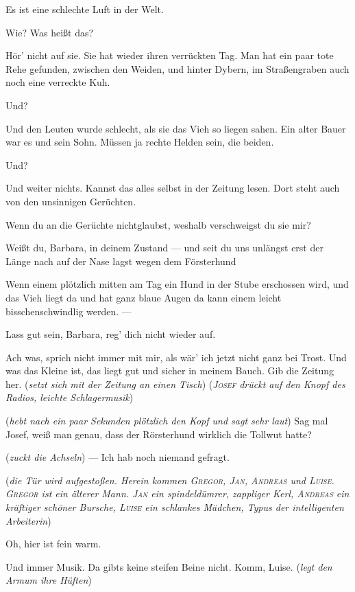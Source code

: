 \documentclass[
	final,
	a4paper,
	ngerman,
	mpinclude = true, %
	twoside = true,
	open = right,
	cleardoublepage = plain,
	DIV = 13,
	BCOR = 1cm,
	titlepage = firstiscover,
	]{scrbook}
\newcommand{\direction}[1]{(\textit{#1})}
\newcommand{\thecharacter}[1]{\textup{\textsc{#1}}\xspace}
\newcommand{\theBarbara}{\thecharacter{Barbara}}
\newcommand{\theJosef}{\thecharacter{Josef}}
\newcommand{\theKathrine}{\thecharacter{Kathrine}}
\newcommand{\theGregor}{\thecharacter{Gregor}}
\newcommand{\theJan}{\thecharacter{Jan}}
\newcommand{\theAndreas}{\thecharacter{Andreas}}
\newcommand{\theLuise}{\thecharacter{Luise}}
\newcommand{\character}[1]{\item[#1]}
\newcommand{\Barbara}{\character{\theBarbara}}
\newcommand{\Josef}{\character{\theJosef}}
\newcommand{\Kathrine}{\character{\theKathrine}}
\newcommand{\Gregor}{\character{\theGregor}}
\newcommand{\Jan}{\character{\theJan}}
\begin{document}
\begin{play}
\Kathrine
Es ist eine schlechte Luft in der Welt.

\Barbara
Wie? Was heißt das?

\Josef
Hör' nicht auf sie. Sie hat wieder ihren verrückten Tag. Man hat ein paar tote Rehe gefunden, zwischen den Weiden, und hinter Dybern, im Straßengraben auch noch eine verreckte Kuh.

\Barbara
Und?

\Josef
Und den Leuten wurde schlecht, als sie das Vieh so liegen sahen. Ein alter Bauer war es und sein Sohn. Müssen ja rechte Helden sein, die beiden.

\Barbara
Und?

\Josef
Und weiter nichts. Kannst das alles selbst in der Zeitung lesen. Dort steht auch von den unsinnigen Gerüchten.

\Barbara
Wenn du an die Gerüchte nichtglaubst, weshalb verschweigst du sie mir?

\Josef
Weißt du, Barbara, in deinem Zustand --- und seit du uns unlängst erst der Länge nach auf der Nase lagst wegen dem Försterhund

\Barbara
Wenn einem plötzlich mitten am Tag ein Hund in der Stube erschossen wird, und das Vieh liegt da und hat ganz blaue Augen da kann einem leicht bisschenschwindlig werden. ---

\Josef
Lass gut sein, Barbara, reg' dich nicht wieder auf.

\Barbara
Ach was, sprich nicht immer mit mir, als wär' ich jetzt nicht ganz bei Trost. Und was das Kleine ist, das liegt gut und sicher in meinem Bauch. Gib die Zeitung her. \direction{setzt sich mit der Zeitung an einen Tisch} \direction{\theJosef drückt auf den Knopf des Radios, leichte Schlagermusik}

\Barbara
\direction{hebt nach ein paar Sekunden plötzlich den Kopf und sagt sehr laut} Sag mal Josef, weiß man genau, dass der Rörsterhund wirklich die Tollwut hatte?

\Josef
\direction{zuckt die Achseln} --- Ich hab noch niemand gefragt.

\direction{die Tür wird aufgestoßen. Herein kommen \theGregor, \theJan, \theAndreas und \theLuise. \theGregor ist ein älterer Mann. \theJan ein spindeldümrer, zappliger Kerl, \theAndreas ein kräftiger schöner Bursche, \theLuise ein schlankes Mädchen, Typus der intelligenten Arbeiterin}

\Gregor
Oh, hier ist fein warm.

\Jan
Und immer Musik. Da gibts keine steifen Beine nicht. Komm, Luise. \direction{legt den Armum ihre Hüften}


\end{play}
\end{document}
